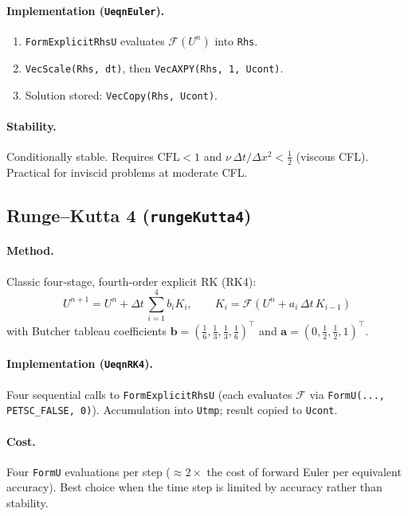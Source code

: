 \documentclass[12pt,a4paper]{article}
\newcommand{\dt}{\Delta t}
\begin{document}
	\paragraph{Implementation (\texttt{UeqnEuler}).}
	\begin{enumerate}
		\item \texttt{FormExplicitRhsU} evaluates $\mathcal{F}(U^n)$ into \texttt{Rhs}.
		\item \texttt{VecScale(Rhs, dt)}, then \texttt{VecAXPY(Rhs, 1, Ucont)}.
		\item Solution stored: \texttt{VecCopy(Rhs, Ucont)}.
	\end{enumerate}
	
	\paragraph{Stability.}
	Conditionally stable. Requires $\text{CFL} < 1$ and
	$\nu\,\dt/\Delta x^2 < \tfrac{1}{2}$ (viscous CFL). Practical for
	inviscid problems at moderate CFL.
	
	\subsection{Runge--Kutta 4 (\texttt{rungeKutta4})}
	
	\paragraph{Method.}
	Classic four-stage, fourth-order explicit RK (RK4):
	\begin{equation}
		U^{n+1} = U^n + \dt\,\sum_{i=1}^{4} b_i K_i,
		\qquad
		K_i = \mathcal{F}(U^n + a_i\,\dt\,K_{i-1})
	\end{equation}
	with Butcher tableau coefficients
	$\bm{b} = (\tfrac{1}{6},\tfrac{1}{3},\tfrac{1}{3},\tfrac{1}{6})^\top$
	and $\bm{a} = (0,\tfrac{1}{2},\tfrac{1}{2},1)^\top$.
	
	\paragraph{Implementation (\texttt{UeqnRK4}).}
	Four sequential calls to \texttt{FormExplicitRhsU} (each evaluates
	$\mathcal{F}$ via \texttt{FormU(..., PETSC\_FALSE, 0)}). Accumulation
	into \texttt{Utmp}; result copied to \texttt{Ucont}.
	
	\paragraph{Cost.} Four \texttt{FormU} evaluations per step
	($\approx 2\times$ the cost of forward Euler per equivalent accuracy).
	Best choice when the time step is limited by accuracy rather than
	stability.
	
\end{document}
